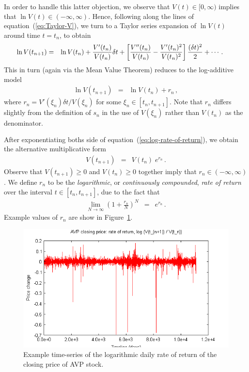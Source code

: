 \documentclass[a4paper]{book}
\begin{document}
In order to handle this latter objection, we observe that
$V(t)\in[0,\infty)$ implies that $\ln V(t)\in(-\infty,\infty)$.
Hence, following along the lines of equation~(\ref{eq:Taylor-V}),
we turn to a Taylor series expansion
of $\ln V(t)$ around time $t=t_{n}$, to obtain
\begin{eqnarray}
\hspace*{-6mm}
\ln V(t_{n+1}) & = & \ln V(t_{n})+\frac{V'(t_{n})}{V(t_n)}\delta t
+\left[\frac{V''(t_{n})}{V(t_n)}
-\frac{V'(t_n)^2}{V(t_n)^2}\right]
\frac{(\delta t)^2}{2}
+\cdots\,.
\label{eq:Taylor-log-V}
\end{eqnarray}
This in turn (again via the Mean Value Theorem)
reduces to the log-additive model
\begin{eqnarray}
\ln V(t_{n+1}) & = & \ln V(t_{n})+r_n\,,
\label{eq:log-rate-of-return}
\end{eqnarray}
where $r_n=V'(\xi_n)\delta t/V(\xi_n)$ for some
$\xi_n\in[t_n,t_{n+1}]$. Note that $r_n$ differs
slightly from the definition of $s_n$ in the use of
$V(\xi_n)$ rather than $V(t_n)$ as the denominator.

After exponentiating boths side of equation~(\ref{eq:log-rate-of-return}), 
we obtain the alternative multiplicative form
\begin{eqnarray}
V(t_{n+1})  & =  & V(t_{n}) \;e^{r_n}\,.
\end{eqnarray}
Observe that $V(t_{n+1})\ge 0$ and $V(t_n)\ge 0$ together
imply that $r_n\in(-\infty,\infty)$.
We define $r_n$ to be the {\em logarithmic},
or {\em continuously compounded}, {\em rate of return} over
the interval $t\in[t_{n},t_{n+1}]$, due to the fact that
\begin{eqnarray}
\lim_{N\rightarrow\infty}\left(1+\frac{r_n}{N}\right)^{N} & = &
e^{r_n}\,.
\end{eqnarray}
Example values of $r_n$ are
show in Figure~\ref{fig:avp-price-log}.
\begin{figure}[hbt]
\includegraphics[scale=0.8]{figures/avp-price-close-log.png}
\caption{Example time-series of the logarithmic daily rate of return of
the closing price of AVP stock.}
\label{fig:avp-price-log}
\end{figure}
\end{document}
